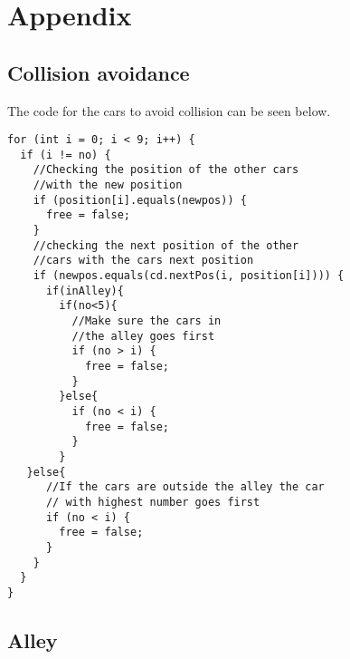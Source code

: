 \section{Appendix}

\subsection{Collision avoidance} \label{sec:collision_avoidance}
The code for the cars to avoid collision can be seen below.
\begin{lstlisting}
for (int i = 0; i < 9; i++) {
  if (i != no) {
    //Checking the position of the other cars 
    //with the new position
    if (position[i].equals(newpos)) {
      free = false;
    }
    //checking the next position of the other 
    //cars with the cars next position
    if (newpos.equals(cd.nextPos(i, position[i]))) {
      if(inAlley){
        if(no<5){
          //Make sure the cars in 
          //the alley goes first
          if (no > i) {
            free = false;
          }
        }else{
          if (no < i) {
            free = false;
          }
        }
   }else{
      //If the cars are outside the alley the car
      // with highest number goes first
      if (no < i) {
        free = false;
      }
    }
  }
}
\end{lstlisting}

\subsection{Alley} \label{sec:alley}

